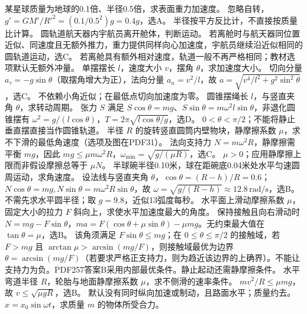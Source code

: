\problemtext 某星球质量为地球的0.1倍、半径0.5倍，求表面重力加速度。
\workings 忽略自转，$g'=GM'/R'^2=(0.1/0.5^2)g=0.4g$，选A。
\crosscheck 半径按平方反比计，不直接按质量比计算。
\problemtext 圆轨道航天器内宇航员离开舱体，判断运动。
\workings 若离舱时与航天器同位置近似、同速度且无额外推力，重力提供同样向心加速度，宇航员继续沿近似相同的圆轨道运动，选C。
\crosscheck 若离舱具有额外相对速度，轨道一般不再严格相同；教材选项默认无额外冲量。
\problemtext 单摆摆长 $l$，速度大小 $v$，摆角 $\theta$，求加速度大小。
\workings 切向分量 $a_\tau=-g\sin\theta$（取摆角增大为正），法向分量 $a_n=v^2/l$，故 $a=\sqrt{v^4/l^2+g^2\sin^2\theta}$，选C。
\crosscheck 不依赖小角近似；在最低点切向加速度为零。
\problemtext 圆锥摆绳长 $l$，与竖直夹角 $\theta$，求转动周期。
\workings 张力 $S$ 满足 $S\cos\theta=mg$、$S\sin\theta=m\omega^2l\sin\theta$，非退化圆锥摆有 $\omega^2=g/(l\cos\theta)$，$T=2\pi\sqrt{l\cos\theta/g}$，选D。
\crosscheck $0<\theta<\pi/2$；不能将静止垂直摆直接当作圆锥轨道。
\problemtext 半径 $R$ 的旋转竖直圆筒内壁物块，静摩擦系数 $\mu$，求不下滑的最低角速度（选项及图在PDF31）。
\workings 法向支持力 $N=m\omega^2R$，静摩擦需平衡 $mg$，因此 $mg\le\mu m\omega^2R$，$\omega_{\min}=\sqrt{g/(\mu R)}$，选C。
\crosscheck $\mu>0$；应用静摩擦上限而非假设摩擦总等于 $\mu N$。
\problemtext 半球碗半径0.10米，球在距碗底0.04米处水平匀速圆周运动，求角速度。
\workings 设法线与竖直夹角 $\theta$，$\cos\theta=(R-h)/R=0.6$；$N\cos\theta=mg,N\sin\theta=m\omega^2R\sin\theta$，故 $\omega=\sqrt{g/(R-h)}\approx12.8\,\mathrm{rad/s}$，选B。
\crosscheck 不需先求水平圆半径；取 $g=9.8$，近似13弧度每秒。
\problemtext 水平面上滑动摩擦系数 $\mu$，固定大小的拉力 $F$ 斜向上，求使水平加速度最大的角度。
\workings 保持接触且向右滑动时 $N=mg-F\sin\theta$，$ma=F(\cos\theta+\mu\sin\theta)-\mu mg$。无约束最大值在 $\tan\theta=\mu$，选B。
\crosscheck 该角须满足 $F\sin\theta\le mg$；在 $0\le\theta\le\pi/2$ 的接触域，若 $F>mg$ 且 $\arctan\mu>\arcsin(mg/F)$，则接触域最优为边界 $\theta=\arcsin(mg/F)$（若要求严格正支持力，则为趋近该边界的上确界）。不能让支持力为负。PDF257答案B采用内部最优条件。静止起动还需静摩擦条件。
\problemtext 水平弯道半径 $R$，轮胎与地面静摩擦系数 $\mu$，求不侧滑的速率条件。
\workings $mv^2/R\le\mu mg$，故 $v\le\sqrt{\mu gR}$，选B。
\crosscheck 默认没有同时纵向加速或制动，且路面水平；质量约去。
\problemtext $x=x_0\sin\omega t$，求质量 $m$ 的物体所受合力。
